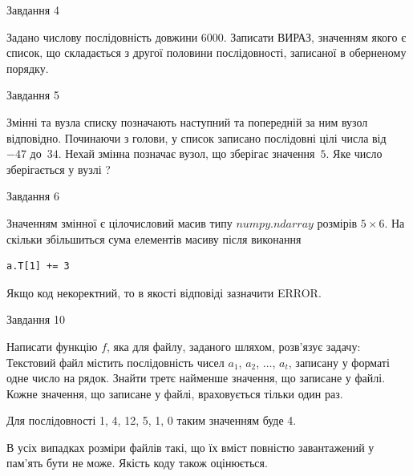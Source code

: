 \documentclass[12pt, ukrainian]{article}
\begin{document}
{               
{\begin{center}Завдання {4}\end{center}}
\vspace{-6mm}

 Задано числову послідовність  довжини 6000. Записати ВИРАЗ, значенням якого є список, що складається з другої половини послідовності, записаної в оберненому порядку.\par

\vspace{10mm}
               
{\begin{center}Завдання {5}\end{center}}
\vspace{-6mm}
Змінні  та  вузла списку позначають наступний та попередній за ним вузол відповідно. Починаючи з голови, у список записано послідовні цілі числа від~$-47$ до~$34$. Нехай змінна  позначає вузол, що зберігає значення~$5$.
Яке число зберігається у вузлі  ?\par

               
{\begin{center}Завдання {6}\end{center}}
\vspace{-6mm}
Значенням змінної  є цілочисловий масив типу $numpy.ndarray$ розмірів $5{\times}6$. На скільки збільшиться сума елементів масиву  після виконання
\begin{verbatim}
a.T[1] += 3
\end{verbatim}


Якщо код некоректний, то в якості відповіді зазначити ERROR.\par

               
{\begin{center}Завдання {10}\end{center}}
\vspace{-6mm}

Написати функцію $f$, яка для файлу, заданого шляхом, розв’язує задачу:\\ Текстовий файл містить послідовність чисел $a_1$, $a_2$, $\ldots$, $a_t$, записану у форматі одне число на рядок. Знайти третє найменше значення, що записане у файлі. Кожне значення, що записане у файлі, враховується тільки один раз. \par
Для послідовності 1, 4, 12, 5, 1, 0 таким значенням буде 4.

В усіх випадках розміри файлів такі, що їх вміст повністю завантажений у пам'ять бути не може. Якість коду також оцінюється.



}
\end{document}
